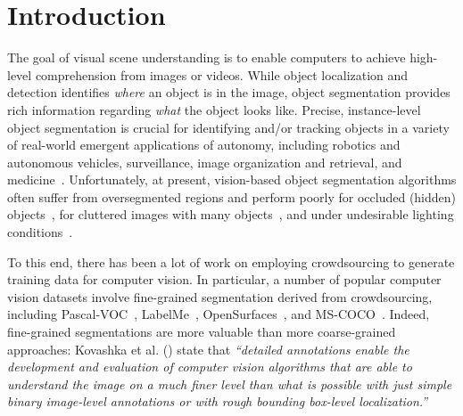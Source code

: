 \section{Introduction\label{sec:intro}}
\par The goal of visual scene understanding is to enable computers to achieve high-level comprehension from images or videos. While object localization and detection identifies \textit{where} an object is in the image, object segmentation provides rich information regarding \textit{what} the object looks like. Precise, instance-level object segmentation is crucial for identifying and/or tracking objects in a variety of real-world emergent applications of autonomy, including robotics and autonomous vehicles, surveillance, image organization and retrieval, and medicine~\cite{Irshad2014,Yamaguchi2012}.
Unfortunately, at present, vision-based object segmentation algorithms often suffer from oversegmented regions and perform poorly for occluded (hidden) objects~\cite{Torralba2010}, for cluttered images with many objects~\cite{Russakovsky2015}, and under undesirable lighting conditions~\cite{bell15minc}. 
\par To this end, there has been a lot of work on employing crowdsourcing to generate training data for computer vision. In particular, a number of popular computer vision datasets involve fine-grained segmentation derived from crowdsourcing, including Pascal-VOC~\cite{Everingham15}, LabelMe~\cite{Torralba2010}, OpenSurfaces~\cite{bell15minc}, and MS-COCO~\cite{Lin2012}.
Indeed, fine-grained segmentations are more valuable than more coarse-grained approaches: Kovashka et al. (\citeyear{AdrianaKovashka2016}) state that {\em ``detailed annotations enable the development and evaluation of computer vision algorithms that are able to understand the image on a much finer level than what is possible with just simple binary image-level annotations or with rough bounding box-level localization.''}
